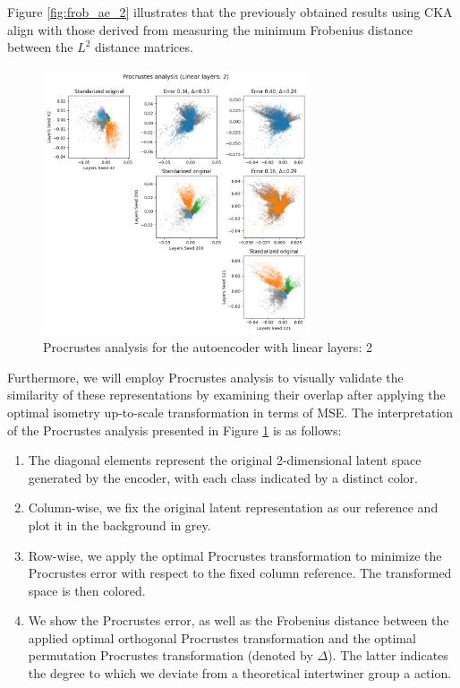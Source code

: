 \documentclass[../main.tex]{subfiles}
\begin{document}
Figure \ref{fig:frob_ae_2} illustrates that the previously obtained results using CKA align with those derived from measuring the minimum Frobenius distance between the $L^2$ distance matrices.

\begin{figure}[ht!]
    \centering
    \includegraphics[width=0.7\textwidth]{figures/rs/sim_ae/procrustes_2__42_200_121.png} 
    \caption{Procrustes analysis for the autoencoder with linear layers: 2}
    \label{fig:proc_ae_2}
\end{figure}


Furthermore, we will employ Procrustes analysis to visually validate the similarity of these representations by examining their overlap after applying the optimal isometry up-to-scale transformation in terms of MSE. The interpretation of the Procrustes analysis presented in Figure \ref{fig:proc_ae_2} is as follows:
\begin{enumerate}
    \item The diagonal elements represent the original 2-dimensional latent space generated by the encoder, with each class indicated by a distinct color.
    \item Column-wise, we fix the original latent representation as our reference and plot it in the background in grey.
    \item Row-wise, we apply the optimal Procrustes transformation to minimize the Procrustes error with respect to the fixed column reference. The transformed space is then colored.
    \item We show the Procrustes error, as well as the Frobenius distance between the applied optimal orthogonal Procrustes transformation and the optimal permutation Procrustes transformation (denoted by $\Delta$). The latter indicates the degree to which we deviate from a theoretical intertwiner group a action.
\end{enumerate}
\end{document}

